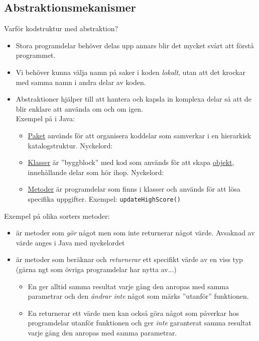 \documentclass{lecturenotes}
\begin{document}
\subsection{Abstraktionsmekanismer}
\begin{Slide}{Varför kodstruktur med abstraktion?}
\begin{itemize}
\item Stora programdelar behöver delas upp annars blir det mycket svårt att förstå programmet.
\item Vi behöver kunna välja namn på saker i koden \textit{lokalt}, utan att det krockar med samma namn i andra delar av koden.
\item Abstraktioner hjälper till att hantera och kapsla in komplexa delar så att de blir enklare att använda om och om igen. \\Exempel på  i Java:
\begin{itemize}\footnotesize
\item \href{https://en.wikipedia.org/wiki/Java_package}{Paket} används för att organisera koddelar som samverkar i en hierarkisk katalogstruktur. Nyckelord: 
\item \href{https://sv.wikipedia.org/wiki/Klass_\%28programmering\%29}{Klasser} är ''byggblock'' med kod som används för att skapa \href{https://sv.wikipedia.org/wiki/Objektorienterad_programmering\#Objekt}{objekt}, innehållande delar som hör ihop. Nyckelord: 
\item \href{https://en.wikipedia.org/wiki/Method_\%28computer_programming\%29}{Metoder} är programdelar som finns i klasser och används för att lösa specifika uppgifter. Exempel: \texttt{updateHighScore()} 
\end{itemize}
\end{itemize}
\end{Slide}

\begin{Slide}{Exempel på olika sorters metoder:}
\begin{itemize}\footnotesize
\item {} är metoder som \textit{gör} något men som inte returnerar något värde. Avsaknad av värde anges i Java med nyckelordet 
\item {} är metoder som beräknar och \textit{returnerar} ett specifikt värde av en viss typ (gärna ngt som övriga programdelar har nytta av...)
\begin{itemize}\footnotesize
\item En  ger alltid samma resultat varje gång den anropas med samma parametrar och den \textit{ändrar inte} något som märks ''utanför'' funktionen.
\item En  returnerar ett värde men kan också göra något som påverkar  hos programdelar utanför funktionen  och ger \textit{inte} garanterat samma resultat varje gång den anropas med samma parametrar.
\end{itemize}
\end{itemize}
\end{Slide}
\end{document}
